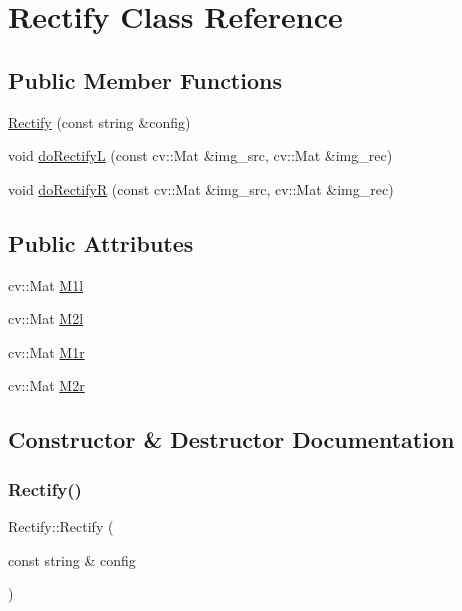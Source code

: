 \hypertarget{class_rectify}{}\section{Rectify Class Reference}
\label{class_rectify}
\subsection*{Public Member Functions}
\begin{DoxyCompactItemize}
\item 
\mbox{\hyperlink{class_rectify_af902b42675372fe6d368d7db9f8f4aeb}{Rectify}} (const string \&config)
\item 
void \mbox{\hyperlink{class_rectify_ab13cffcfad378e7fe0e2acc30b34b898}{do\+RectifyL}} (const cv\+::\+Mat \&img\+\_\+src, cv\+::\+Mat \&img\+\_\+rec)
\item 
void \mbox{\hyperlink{class_rectify_a730bcf1354cf3235bc968e6614fac588}{do\+RectifyR}} (const cv\+::\+Mat \&img\+\_\+src, cv\+::\+Mat \&img\+\_\+rec)
\end{DoxyCompactItemize}
\subsection*{Public Attributes}
\begin{DoxyCompactItemize}
\item 
cv\+::\+Mat \mbox{\hyperlink{class_rectify_a2bccf95a2c08fd34ecba598b6ace5f3b}{M1l}}
\item 
cv\+::\+Mat \mbox{\hyperlink{class_rectify_a5b6d2e9cf6d4e5db0ca0f75247fdb120}{M2l}}
\item 
cv\+::\+Mat \mbox{\hyperlink{class_rectify_a38bed768da331d8097e03b4cb9c6c96e}{M1r}}
\item 
cv\+::\+Mat \mbox{\hyperlink{class_rectify_a57ade3e3cb60f17a6fae8095fd79bc6c}{M2r}}
\end{DoxyCompactItemize}


\subsection{Constructor \& Destructor Documentation}
\mbox{\label{class_rectify_af902b42675372fe6d368d7db9f8f4aeb}} 
\subsubsection{\texorpdfstring{Rectify()}{Rectify()}}
{\footnotesize\ttfamily Rectify\+::\+Rectify (\begin{DoxyParamCaption}\item[{const string \&}]{config }\end{DoxyParamCaption})}



